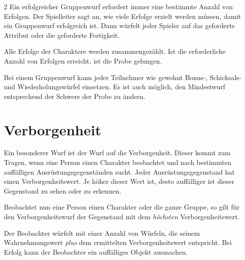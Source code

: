 \begin{multicols}{2}
Ein erfolgreicher Gruppenwurf erfordert immer eine bestimmte Anzahl von Erfolgen. Der Spielleiter sagt an, wie viele Erfolge erzielt werden müssen, damit ein Gruppenwurf erfolgreich ist. Dann würfelt jeder Spieler auf das geforderte Attribut oder die geforderte Fertigkeit.

Alle Erfolge der Charaktere werden zusammengezählt. Ist die erforderliche Anzahl von Erfolgen erreicht, ist die Probe gelungen.

Bei einem Gruppenwurf kann jeder Teilnehmer wie gewohnt Bonus-, Schicksals- und Wiederholungswürfel einsetzen. Es ist auch möglich, den Mindestwurf entsprechend der Schwere der Probe zu ändern.

\section{Verborgenheit}

Ein besonderer Wurf ist der Wurf auf die Verborgenheit. Dieser kommt zum Tragen, wenn eine Person einen Charakter beobachtet und nach bestimmten auffälligen Ausrüstungsgegenständen sucht. Jeder Ausrüstungsgegenstand hat einen Verborgenheitswert. Je höher dieser Wert ist, desto auffälliger ist dieser Gegenstand zu sehen oder zu erkennen.

Beobachtet nun eine Person einen Charakter oder die ganze Gruppe, so gilt für den Verborgenheitswurf der Gegenstand mit dem \textit{höchsten} Verborgenheitswert.

Der Beobachter würfelt mit einer Anzahl von Würfeln, die seinem Wahrnehmungswert \textit{plus} dem ermittelten Verborgenheitswert entspricht. Bei Erfolg kann der Beobachter ein auffälliges Objekt ausmachen.
\end{multicols}
